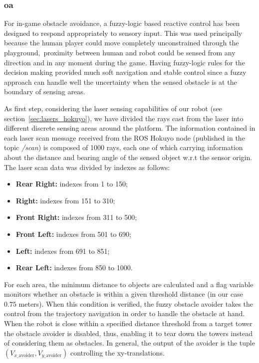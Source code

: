 \subsubsection{\glsdesc{oa}}\label{sec:obt_avoidance}
For in-game obstacle avoidance, a fuzzy-logic based reactive control has been designed to respond appropriately to sensory input. This was used principally because the human player could move completely unconstrained through the playground,~\ie proximity between human and robot could be sensed from any direction and in any moment during the game. Having fuzzy-logic rules for the decision making provided much soft navigation and stable control since a fuzzy approach can handle well the uncertainty when the sensed obstacle is at the boundary of sensing areas.

As first step, considering the laser sensing capabilities of our robot (see section~\ref{sec:lasers_hokuyo}), we have divided the rays cast from the laser into different discrete sensing areas around the platform. The information  contained in each laser scan message received from the ROS Hokuyo node (published in the topic \textit{/scan}) is composed of 1000 rays, each one of which carrying information about the distance and bearing angle of the sensed object w.r.t the sensor origin. The laser scan data was divided by indexes as follows:

\begin{itemize}
	\item \textbf{Rear Right:} indexes from 1 to 150;
	\item \textbf{Right:} indexes from 151 to 310;
	\item \textbf{Front Right:} indexes from 311 to 500;
	\item \textbf{Front Left:} indexes from 501 to 690;
	\item \textbf{Left:} indexes from 691 to 851;
	\item \textbf{Rear Left:} indexes from 850 to 1000.
\end{itemize}

For each area, the minimum distance to objects are calculated and a flag variable monitors whether an obstacle is within a given threshold distance (in our case $0.75$ meters). When this condition is verified, the fuzzy obstacle avoider takes the control from the trajectory navigation in order to handle the obstacle at hand. When the robot is close within a specified distance threshold from a target tower the obstacle avoider is disabled, thus, enabling it to tear down the towers instead of considering them as obstacles. In general, the output of the avoider is the tuple $(V_{x\_\text{avoider}}, V_{y\_ \text{avoider}})$ controlling the xy-translations.

